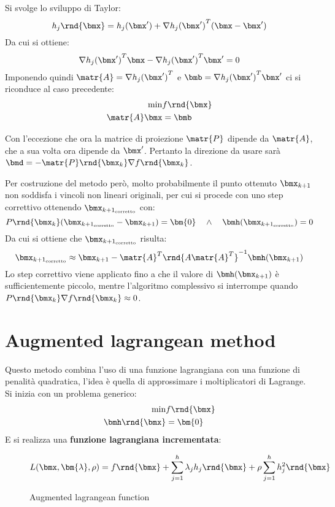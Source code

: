 \documentclass[\main/main.tex]{subfiles}
\begin{document}
Si svolge lo sviluppo di Taylor:
\[
    h_j\rnd{\bmx} = h_j(\bmx') + \nabla {h_j(\bmx')}^T(\bmx-\bmx')
\]
Da cui si ottiene:
\[
    \nabla {h_j(\bmx')}^T\bmx - \nabla {h_j(\bmx')}^T\bmx' = 0
\]
Imponendo quindi \(\matr{A} = \nabla {h_j(\bmx')}^T\) e \(\bmb = \nabla {h_j(\bmx')}^T\bmx'\) ci si riconduce al caso precedente:
\begin{align*}
    \min &f\rnd{\bmx}\\
    \matr{A}\bmx &= \bmb
\end{align*}

Con l'eccezione che ora la matrice di proiezione \(\matr{P}\) dipende da \(\matr{A}\), che a sua volta ora dipende da \(\bmx'\). Pertanto la direzione da usare sarà \(\bmd = -\matr{P}\rnd{\bmx_k}\nabla f\rnd{\bmx_k}\).

Per costruzione del metodo però, molto probabilmente il punto ottenuto \(\bmx_{k+1}\) non soddisfa i vincoli non lineari originali, per cui si procede con uno step correttivo ottenendo \(\bmx_{{k+1}_{\text{corretto}}}\) con:
\[
    P\rnd{\bmx_k}(\bmx_{{k+1}_{\text{corretto}}}-\bmx_{k+1}) = \bm{0} \quad \land \quad \bmh(\bmx_{{k+1}_{\text{corretto}}}) = 0
\]Da cui si ottiene che \(\bmx_{{k+1}_{\text{corretto}}}\) risulta:
\[
    \bmx_{{k+1}_{\text{corretto}}} \approx \bmx_{k+1} - \matr{A}^T\rnd{A\matr{A}^T}^{-1} \bmh(\bmx_{k+1})
\]
Lo step correttivo viene applicato fino a che il valore di \(\bmh(\bmx_{k+1})\) è sufficientemente piccolo, mentre l'algoritmo complessivo si interrompe quando \(P\rnd{\bmx_k}\nabla f\rnd{\bmx_k} \approx 0\).

\clearpage
\section{Augmented lagrangean method}
Questo metodo combina l'uso di una funzione lagrangiana con una funzione di penalità quadratica, l'idea è quella di approssimare i moltiplicatori di Lagrange. Si inizia con un problema generico:
\begin{align*}
    \min &f\rnd{\bmx}\\
    \bmh\rnd{\bmx} &= \bm{0}
\end{align*}
E si realizza una \textbf{funzione lagrangiana incrementata}:

\begin{figure}
\[
    L(\bmx, \bm{\lambda}, \rho) = f\rnd{\bmx} + \sum_{j=1}^h \lambda_j h_j\rnd{\bmx} + \rho\sum_{j=1}^h h_j^2\rnd{\bmx}
\]\caption{Augmented lagrangean function}
\end{figure}
\end{document}
